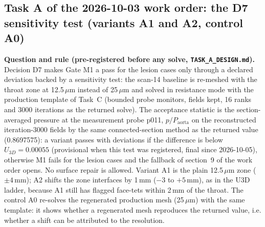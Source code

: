 \documentclass[11pt]{article}
\begin{document}
\subsection{Task A of the 2026-10-03 work order: the D7 sensitivity test (variants A1 and A2, control A0)}
\label{sec:taskA}
\textbf{Question and rule (pre-registered before any solve, \texttt{TASK\_A\_DESIGN.md}).} Decision D7 makes Gate M1 a pass for the lesion cases only through a declared deviation backed by a sensitivity test: the scan-14 baseline is re-meshed with the throat zone at 12.5\,$\mu$m instead of 25\,$\mu$m and solved in resistance mode with the production template of Task~C (bounded probe monitors, fields kept, 16 ranks and 3000 iterations as the returned solve). The acceptance statistic is the section-averaged pressure at the measurement probe p011, $p/P_\text{aorta}$ on the reconstructed iteration-3000 fields by the same connected-section method as the returned value (0.8697575): a variant passes with deviations if the difference is below $U_{3D}=0.00055$ (provisional when this test was registered, final since 2026-10-05), otherwise M1 fails for the lesion cases and the fallback of section~9 of the work order opens. No surface repair is allowed. Variant A1 is the plain 12.5\,$\mu$m zone ($\pm4$\,mm); A2 shifts the zone interfaces by 1\,mm ($-3$ to $+5$\,mm), as in the U3D ladder, because A1 still has flagged face-tets within 2\,mm of the throat. The control A0 re-solves the regenerated production mesh (25\,$\mu$m) with the same template: it shows whether a regenerated mesh reproduces the returned value, i.e. whether a shift can be attributed to the resolution.
\end{document}
